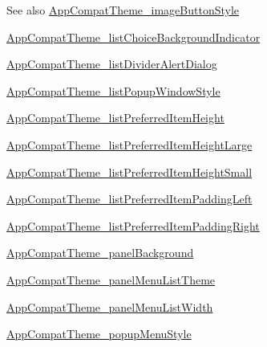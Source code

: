 \begin{DoxySeeAlso}{See also}
\hyperlink{classandroid_1_1support_1_1v7_1_1appcompat_1_1R_1_1styleable_a0af1c0cbacd91d7d7139ddfaf38325f6}{App\+Compat\+Theme\+\_\+image\+Button\+Style} 

\hyperlink{classandroid_1_1support_1_1v7_1_1appcompat_1_1R_1_1styleable_a099705a7173bf4f42f97f179e7b70d69}{App\+Compat\+Theme\+\_\+list\+Choice\+Background\+Indicator} 

\hyperlink{classandroid_1_1support_1_1v7_1_1appcompat_1_1R_1_1styleable_a7a821c50df10592a0cbb6633ce4d89b2}{App\+Compat\+Theme\+\_\+list\+Divider\+Alert\+Dialog} 

\hyperlink{classandroid_1_1support_1_1v7_1_1appcompat_1_1R_1_1styleable_a4a1930d25bde9775ddf86760b943b027}{App\+Compat\+Theme\+\_\+list\+Popup\+Window\+Style} 

\hyperlink{classandroid_1_1support_1_1v7_1_1appcompat_1_1R_1_1styleable_a491ac1bac5d3e90d2488434571ab909e}{App\+Compat\+Theme\+\_\+list\+Preferred\+Item\+Height} 

\hyperlink{classandroid_1_1support_1_1v7_1_1appcompat_1_1R_1_1styleable_aeb22f3a67066dc3fc32649e2528521f9}{App\+Compat\+Theme\+\_\+list\+Preferred\+Item\+Height\+Large} 

\hyperlink{classandroid_1_1support_1_1v7_1_1appcompat_1_1R_1_1styleable_a9c44e92688d2917cbaa6860767dc5c7f}{App\+Compat\+Theme\+\_\+list\+Preferred\+Item\+Height\+Small} 

\hyperlink{classandroid_1_1support_1_1v7_1_1appcompat_1_1R_1_1styleable_a69a77a880e875071ddde0553b2220450}{App\+Compat\+Theme\+\_\+list\+Preferred\+Item\+Padding\+Left} 

\hyperlink{classandroid_1_1support_1_1v7_1_1appcompat_1_1R_1_1styleable_a233f7ce58f3391f99dd01b686899d077}{App\+Compat\+Theme\+\_\+list\+Preferred\+Item\+Padding\+Right} 

\hyperlink{classandroid_1_1support_1_1v7_1_1appcompat_1_1R_1_1styleable_aa555e7cf895108969bdf9dd9d68743be}{App\+Compat\+Theme\+\_\+panel\+Background} 

\hyperlink{classandroid_1_1support_1_1v7_1_1appcompat_1_1R_1_1styleable_abe4dcb478c5a3aa191bd3e7faf51f323}{App\+Compat\+Theme\+\_\+panel\+Menu\+List\+Theme} 

\hyperlink{classandroid_1_1support_1_1v7_1_1appcompat_1_1R_1_1styleable_a6f48a7a199f63c3e2f95ae393ff66aeb}{App\+Compat\+Theme\+\_\+panel\+Menu\+List\+Width} 

\hyperlink{classandroid_1_1support_1_1v7_1_1appcompat_1_1R_1_1styleable_a6b864691ad3dd51a0c728b5e6b9cc7f5}{App\+Compat\+Theme\+\_\+popup\+Menu\+Style} 


\end{DoxySeeAlso}
